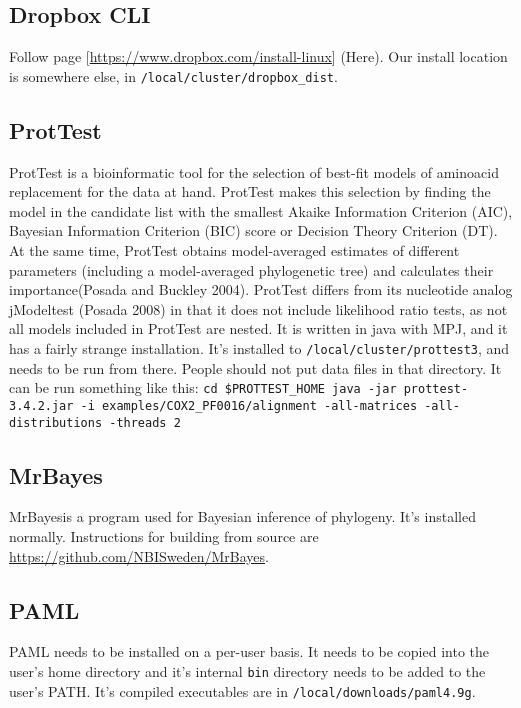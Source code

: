 \documentclass[]{book}
\begin{document}
\subsection{Dropbox CLI}\label{dropbox-cli}

Follow page {[}\url{https://www.dropbox.com/install-linux}{]} (Here).
Our install location is somewhere else, in
\texttt{/local/cluster/dropbox\_dist}.

\subsection{ProtTest}\label{prottest}

ProtTest is a bioinformatic tool for the selection of best-fit models of
aminoacid replacement for the data at hand. ProtTest makes this
selection by finding the model in the candidate list with the smallest
Akaike Information Criterion (AIC), Bayesian Information Criterion (BIC)
score or Decision Theory Criterion (DT). At the same time, ProtTest
obtains model-averaged estimates of different parameters (including a
model-averaged phylogenetic tree) and calculates their importance(Posada
and Buckley 2004). ProtTest differs from its nucleotide analog
jModeltest (Posada 2008) in that it does not include likelihood ratio
tests, as not all models included in ProtTest are nested. It is written
in java with MPJ, and it has a fairly strange installation. It's
installed to \texttt{/local/cluster/prottest3}, and needs to be run from
there. People should not put data files in that directory. It can be run
something like this:
\texttt{cd\ \$PROTTEST\_HOME\ java\ -jar\ prottest-3.4.2.jar\ -i\ examples/COX2\_PF0016/alignment\ -all-matrices\ -all-distributions\ -threads\ 2}

\subsection{MrBayes}\label{mrbayes}

MrBayesis a program used for Bayesian inference of phylogeny. It's
installed normally. Instructions for building from source are
\href{Here}{https://github.com/NBISweden/MrBayes}.

\subsection{PAML}\label{paml}

PAML needs to be installed on a per-user basis. It needs to be copied
into the user's home directory and it's internal \texttt{bin} directory
needs to be added to the user's PATH. It's compiled executables are in
\texttt{/local/downloads/paml4.9g}.
\end{document}
